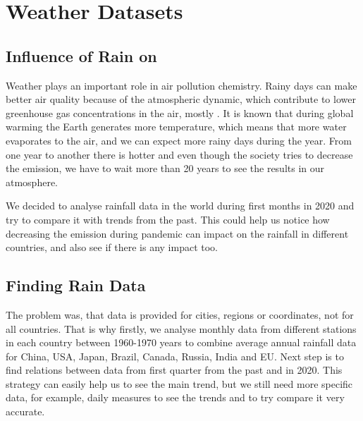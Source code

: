 \section{Weather Datasets}

\subsection{Influence of Rain on }

Weather plays an important role in air pollution chemistry. Rainy days can make better air quality because of the atmospheric dynamic, which contribute to lower greenhouse gas concentrations in the air, mostly . It is known that during global warming the Earth generates more temperature, which means that more water evaporates to the air, and we can expect more rainy days during the year. From one year to another there is hotter and even though the society tries to decrease the  emission, we have to wait more than 20 years to see the results in our atmosphere. 

We decided to analyse rainfall data in the world during first months in 2020 and try to compare it with trends from the past. This could help us notice how decreasing the  emission during pandemic can impact on the rainfall in different countries, and also see if there is any impact too. 

\subsection{Finding Rain Data}

The problem was, that data is provided for cities, regions or coordinates, not for all countries. That is why 
firstly, we analyse monthly data from different stations in each country between 1960-1970 years to combine average annual rainfall data for China, USA, Japan, Brazil, Canada, Russia, India and EU. Next step is to find relations between data from first quarter from the past and in 2020. 
This strategy can easily help us to see the main trend, but we still need more specific data, for example, daily measures to see the trends and to try compare it  very accurate. 


